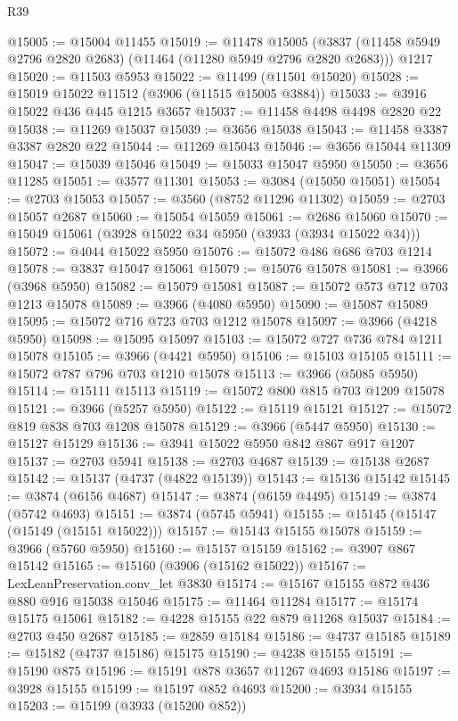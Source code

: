 \begin{lexlean}{R39}
\begin{coremodule}
@15005 := @15004 @11455
@15019 := @11478
    @15005
    (@3837 (@11458 @5949 @2796 @2820 @2683) (@11464 (@11280 @5949 @2796 @2820 @2683)))
    @1217
@15020 := @11503 @5953
@15022 := @11499 (@11501 @15020)
@15028 := @15019 @15022 @11512 (@3906 (@11515 @15005 @3884))
@15033 := @3916 @15022 @436 @445 @1215 @3657
@15037 := @11458 @4498 @4498 @2820 @22
@15038 := @11269 @15037
@15039 := @3656 @15038
@15043 := @11458 @3387 @3387 @2820 @22
@15044 := @11269 @15043
@15046 := @3656 @15044 @11309
@15047 := @15039 @15046
@15049 := @15033 @15047 @5950
@15050 := @3656 @11285
@15051 := @3577 @11301
@15053 := @3084 (@15050 @15051)
@15054 := @2703 @15053
@15057 := @3560 (@8752 @11296 @11302)
@15059 := @2703 @15057 @2687
@15060 := @15054 @15059
@15061 := @2686 @15060
@15070 := @15049 @15061 (@3928 @15022 @34 @5950 (@3933 (@3934 @15022 @34)))
@15072 := @4044 @15022 @5950
@15076 := @15072 @486 @686 @703 @1214
@15078 := @3837 @15047 @15061
@15079 := @15076 @15078
@15081 := @3966 (@3968 @5950)
@15082 := @15079 @15081
@15087 := @15072 @573 @712 @703 @1213 @15078
@15089 := @3966 (@4080 @5950)
@15090 := @15087 @15089
@15095 := @15072 @716 @723 @703 @1212 @15078
@15097 := @3966 (@4218 @5950)
@15098 := @15095 @15097
@15103 := @15072 @727 @736 @784 @1211 @15078
@15105 := @3966 (@4421 @5950)
@15106 := @15103 @15105
@15111 := @15072 @787 @796 @703 @1210 @15078
@15113 := @3966 (@5085 @5950)
@15114 := @15111 @15113
@15119 := @15072 @800 @815 @703 @1209 @15078
@15121 := @3966 (@5257 @5950)
@15122 := @15119 @15121
@15127 := @15072 @819 @838 @703 @1208 @15078
@15129 := @3966 (@5447 @5950)
@15130 := @15127 @15129
@15136 := @3941 @15022 @5950 @842 @867 @917 @1207
@15137 := @2703 @5941
@15138 := @2703 @4687
@15139 := @15138 @2687
@15142 := @15137 (@4737 (@4822 @15139))
@15143 := @15136 @15142
@15145 := @3874 (@6156 @4687)
@15147 := @3874 (@6159 @4495)
@15149 := @3874 (@5742 @4693)
@15151 := @3874 (@5745 @5941)
@15155 := @15145 (@15147 (@15149 (@15151 @15022)))
@15157 := @15143 @15155 @15078
@15159 := @3966 (@5760 @5950)
@15160 := @15157 @15159
@15162 := @3907 @867 @15142
@15165 := @15160 (@3906 (@15162 @15022))
@15167 := LexLeanPreservation.conv_let @3830
@15174 := @15167 @15155 @872 @436 @880 @916 @15038 @15046
@15175 := @11464 @11284
@15177 := @15174 @15175 @15061
@15182 := @4228 @15155 @22 @879 @11268 @15037
@15184 := @2703 @450 @2687
@15185 := @2859 @15184
@15186 := @4737 @15185
@15189 := @15182 (@4737 @15186) @15175
@15190 := @4238 @15155
@15191 := @15190 @875
@15196 := @15191 @878 @3657 @11267 @4693 @15186
@15197 := @3928 @15155
@15199 := @15197 @852 @4693
@15200 := @3934 @15155
@15203 := @15199 (@3933 (@15200 @852))

\end{coremodule}
\end{lexlean}
